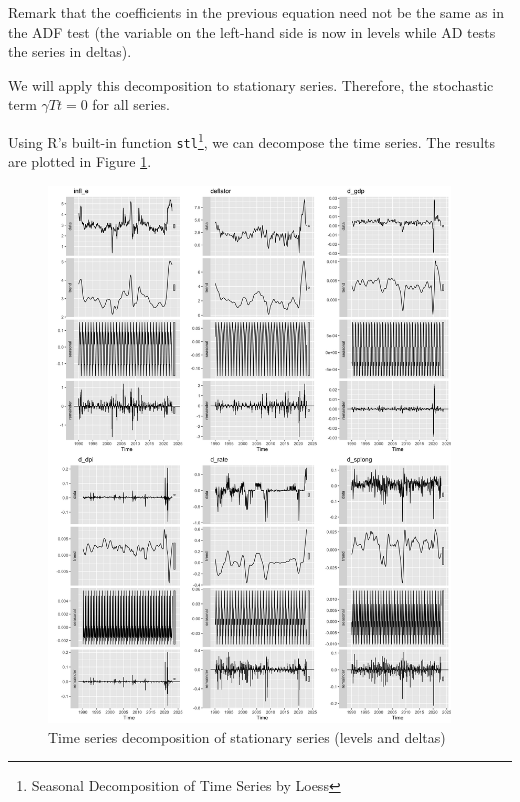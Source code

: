 \documentclass[hidelinks,12pts]{article}
\DeclareMathOperator{\1}{\mathbbm{1}}
\begin{document}
Remark that the coefficients in the previous equation need not be the same as in the ADF test (the variable on the left-hand side is now in levels while AD tests the series in deltas). 

We will apply this decomposition to stationary series. Therefore, the stochastic term $\gamma Tt = 0 $ for all series.


Using R's built-in function \texttt{stl}\footnote{Seasonal Decomposition of Time Series by Loess}, we can decompose the time series. 
The results are plotted in Figure \ref{fig:all_decompvf}.

\begin{figure}[h!]
    \centering
    \includegraphics[width=0.95\textwidth]{IMAGES/all_decompositions.png}
    \caption{Time series decomposition of stationary series (levels and deltas)}
    \label{fig:all_decompvf}
\end{figure}
\end{document}
